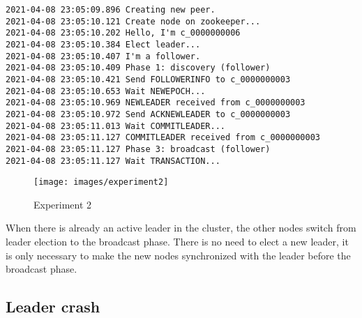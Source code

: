 \begin{verbatim}
2021-04-08 23:05:09.896 Creating new peer.
2021-04-08 23:05:10.121 Create node on zookeeper...
2021-04-08 23:05:10.202 Hello, I'm c_0000000006
2021-04-08 23:05:10.384 Elect leader...
2021-04-08 23:05:10.407 I'm a follower.
2021-04-08 23:05:10.409 Phase 1: discovery (follower)
2021-04-08 23:05:10.421 Send FOLLOWERINFO to c_0000000003
2021-04-08 23:05:10.653 Wait NEWEPOCH...
2021-04-08 23:05:10.969 NEWLEADER received from c_0000000003
2021-04-08 23:05:10.972 Send ACKNEWLEADER to c_0000000003
2021-04-08 23:05:11.013 Wait COMMITLEADER...
2021-04-08 23:05:11.127 COMMITLEADER received from c_0000000003
2021-04-08 23:05:11.127 Phase 3: broadcast (follower)
2021-04-08 23:05:11.127 Wait TRANSACTION...
\end{verbatim}

\begin{figure}[H]
    \centering
    \texttt{[image: images/experiment2]}
    \caption{Experiment 2}
    \label{fig:experiment2}
\end{figure}

When there is already an active leader in the cluster, the other nodes switch from leader election to the broadcast phase. There is no need to elect a new leader, it is only necessary to make the new nodes synchronized with the leader before the broadcast phase.

\subsection{Leader crash\label{sec:crash}}

